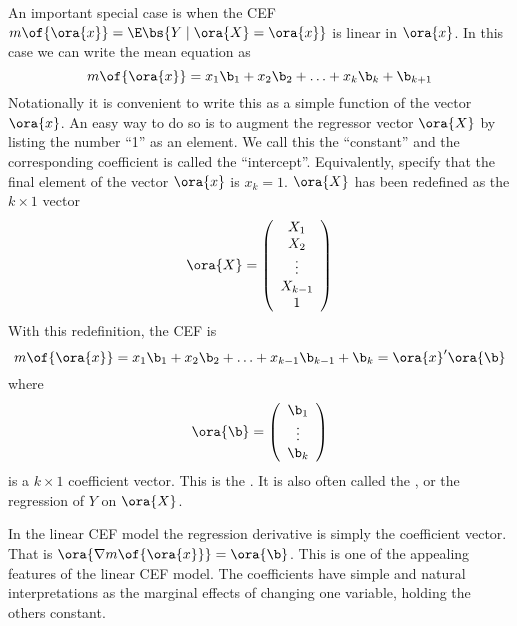 An important special case is when the CEF $m\of{\ora{x}} = \E\bs{Y \mid \ora{X} = \ora{x}}$ is linear in $\ora{x}$. In this case we can write the mean equation as 
\begin{equation}
    \notag
    m\of{\ora{x}} = x_1 \b_1 + x_2 \b_2 + \ldots + x_k \b_k + \b_{k+1}
\end{equation} 
Notationally it is convenient to write this as a simple function of the vector $\ora{x}$. An easy way to do so is to augment the regressor vector $\ora{X}$ by listing the number ``1'' as an element. We call this the ``constant'' and the corresponding coefficient is called the “intercept”. Equivalently, specify that the final element of the vector $\ora{x}$ is $x_k = 1$. $\ora{X}$ has been redefined as the $k \times 1$ vector 
\begin{equation}
    \label{2.12}
    \ora{X} = \left(\begin{array}{ccccc}
        X_1 \\
        X_2 \\
        \vdots \\
        X_{k-1} \\
        1
    \end{array}\right)
\end{equation}
With this redefinition, the CEF is 
\begin{equation}
    \label{hansen_eq_2_13}
    m\of{\ora{x}} = x_1 \b_1 + x_2 \b_2 + \ldots + x_{k-1} \b_{k-1} + \b_{k} = \ora{x}^\prime \ora{\b}
\end{equation}
where 
\begin{equation}
    \ora{\b} = \left(\begin{array}{ccc}
        \b_1 \\
        \vdots \\
        \b_k
    \end{array}\right)
\end{equation}
is a $k \times 1$ coefficient vector. This is the . It is also often called the , or the regression of $Y$ on $\ora{X}$.

In the linear CEF model the regression derivative is simply the coefficient vector. That is $\ora{\nabla m\of{\ora{x}}} = \ora{\b}$. This is one of the appealing features of the linear CEF model. The coefficients have simple and natural interpretations as the marginal effects of changing one variable, holding the others constant.

